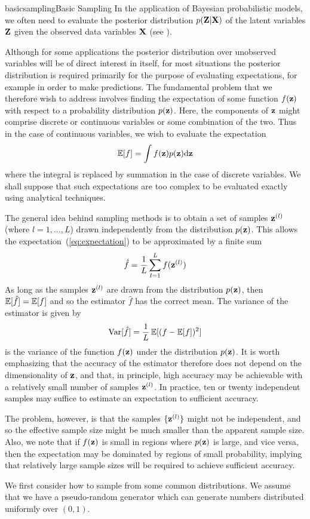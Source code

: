 \documentclass[9pt]{article}
\begin{document}
\begin{topic}{basicsampling}{Basic Sampling}
In the application of Bayesian probabilistic models, we often need to evaluate the posterior distribution $p(\mathbf{Z}|\mathbf{X})$ of the latent variables $\mathbf{Z}$ given the observed data variables $\mathbf{X}$ (see ).

Although for some applications the posterior distribution over unobserved variables will be of direct interest in itself, for most situations the posterior distribution is required primarily for the purpose of evaluating expectations, for example in order to make predictions. The fundamental problem that we therefore wish to address involves finding the expectation of some function $f(\mathbf{z})$ with respect to a probability distribution $p(\mathbf{z})$. Here, the components of $\mathbf{z}$ might comprise discrete or continuous variables or some combination of the two. Thus in the case of continuous variables, we wish to evaluate the expectation
\begin{equation}
\label{eq:expectation}
\operatorname{\mathbb{E}}[f] = \int f(\mathbf{z})p(\mathbf{z})\mathrm{d} \mathbf{z}
\end{equation}
where the integral is replaced by summation in the case of discrete variables.  We shall suppose that such expectations are too complex to be evaluated exactly using analytical techniques.

The general idea behind sampling methods is to obtain a set of samples $\mathbf{z}^{(l)}$ (where $l = 1,\ldots, L$) drawn independently from the distribution $p(\mathbf{z})$. This allows the expectation~(\ref{eq:expectation}) to be approximated by a finite sum
\[
\hat{f} = \frac{1}{L}\sum_{l=1}^{L} f(\mathbf{z}^{(l)})
\]
As long as the samples $\mathbf{z}^{(l)}$ are drawn from the distribution $p(\mathbf{z})$, then $\operatorname{\mathbb{E}}[\hat{f}] = \operatorname{\mathbb{E}}[f]$ and so the estimator $\hat{f}$ has the correct mean. The variance of the estimator is given by
\[
	\text{Var}[\hat{f}] = \frac{1}{L}\operatorname{\mathbb{E}}[(f-\operatorname{\mathbb{E}}[f])^2]
\]
is the variance of the function $f(\mathbf{z})$ under the distribution $p(\mathbf{z})$. It is worth emphasizing that the accuracy of the estimator therefore does not depend on the dimensionality of $\mathbf{z}$, and that, in principle, high accuracy may be achievable with a relatively small number of samples $\mathbf{z}^{(l)}$. In practice, ten or twenty independent samples may suffice to estimate an expectation to sufficient accuracy.

The problem, however, is that the samples $\{\mathbf{z}^{(l)}\}$ might not be independent, and so the effective sample size might be much smaller than the apparent sample size. Also, we note that if $f(\mathbf{z})$ is small in regions where $p(\mathbf{z})$ is large, and vice versa, then the expectation may be dominated by regions of small probability, implying that relatively large sample sizes will be required to achieve sufficient accuracy.

We first consider how to sample from some common distributions. We assume that we have a pseudo-random generator which can generate numbers distributed uniformly over $(0,1)$.
\end{topic}
\end{document}
